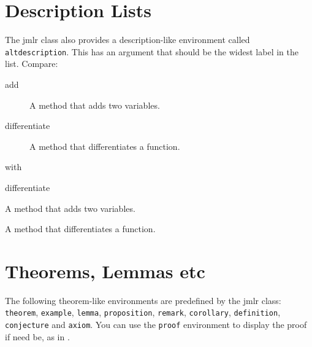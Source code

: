 \documentclass[pmlr]{jmlr}%
\begin{document}
\section{Description Lists}

The \textsf{jmlr} class also provides a description-like 
environment called \texttt{altdescription}. This has an
argument that should be the widest label in the list. Compare:
\begin{description}
\item[add] A method that adds two variables.
\item[differentiate] A method that differentiates a function.
\end{description}
with
\begin{altdescription}{differentiate}
\item[add] A method that adds two variables.
\item[differentiate] A method that differentiates a function.
\end{altdescription}

\section{Theorems, Lemmas etc}
\label{sec:theorems}

The following theorem-like environments are predefined by
the \textsf{jmlr} class: \texttt{theorem}, \texttt{example},
\texttt{lemma}, \texttt{proposition}, \texttt{remark}, 
\texttt{corollary}, \texttt{definition}, \texttt{conjecture}
and \texttt{axiom}. You can use the \texttt{proof} environment
to display the proof if need be, as in .
\end{document}
